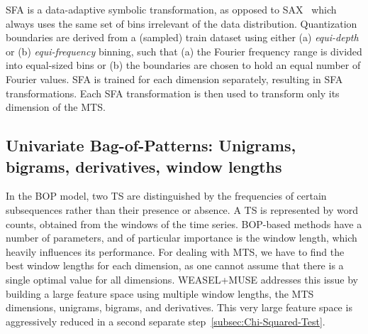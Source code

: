 \documentclass[sigconf]{acmart}
\begin{document}
SFA is a data-adaptive symbolic transformation, as opposed to SAX~\cite{Lin2007} which always uses the same set of bins irrelevant of the data distribution. Quantization boundaries are derived from a (sampled) train dataset using either (a) \emph{equi-depth} or (b) \emph{equi-frequency} binning, such that (a) the Fourier frequency range is divided into equal-sized bins or (b) the boundaries are chosen to hold an equal number of Fourier values. SFA is trained for each dimension separately, resulting in  SFA transformations. Each SFA transformation is then used to transform only its dimension of the MTS.



\subsection{Univariate Bag-of-Patterns: Unigrams, bigrams, derivatives, window lengths}\label{subsec:BOP}

In the BOP model, two TS are distinguished by the frequencies of certain subsequences rather than their presence or absence. A TS is represented by word counts, obtained from the windows of the time series. BOP-based methods have a number of parameters, and of particular importance is the window length, which heavily influences its performance. For dealing with MTS, we have to find the best window lengths for each dimension, as one cannot assume that there is a single optimal value for all dimensions. 
WEASEL+MUSE addresses this issue by building a large feature space using multiple window lengths, the MTS dimensions, unigrams, bigrams, and derivatives. This very large feature space is aggressively reduced in a second separate step~\ref{subsec:Chi-Squared-Test}. 
\end{document}
